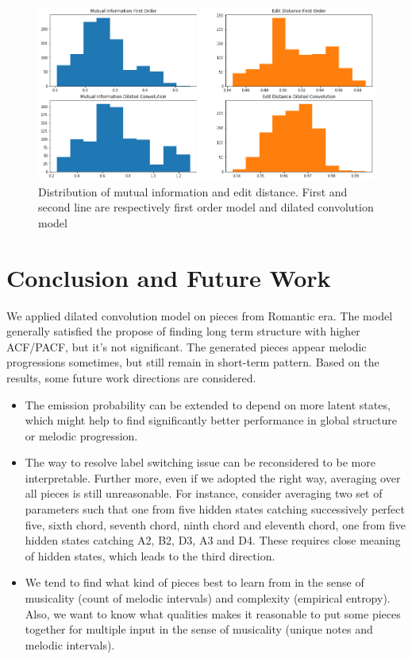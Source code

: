 \documentclass[10pt, oneside]{article}
\begin{document}
\begin{figure}[H]
\centering

  \includegraphics[width=0.9\linewidth]{mued.png}
  \caption{Distribution of mutual information and edit distance. First and second line are respectively first order model and dilated convolution model }
  \label{fig:mued}
\end{figure}

\section{Conclusion and Future Work}
We applied dilated convolution model on pieces from Romantic era. The model generally satisfied the propose of finding long term structure with higher ACF/PACF, but it's not significant. The generated pieces appear melodic progressions sometimes, but still remain in short-term pattern. 
Based on the results, some future work directions are considered. 
\begin{itemize}
\item The emission probability can be extended to depend on more latent states, which might help to find significantly better performance in global structure or melodic progression. 
\item The way to resolve label switching issue can be reconsidered to be more interpretable. Further more, even if we adopted the right way, averaging over all pieces is still unreasonable. For instance, consider averaging two set of parameters such that one from five hidden states catching successively perfect five, sixth chord, seventh chord, ninth chord and eleventh chord, one from five hidden states catching A2, B2, D3, A3 and D4. These requires close meaning of hidden states, which leads to the third direction.
\item We tend to find what kind of pieces best to learn from in the sense of musicality (count of melodic intervals) and  complexity (empirical entropy). Also, we want to know what qualities makes it reasonable to put some pieces together for multiple input in the sense of musicality (unique notes and melodic intervals).
\end{itemize}


\end{document}
